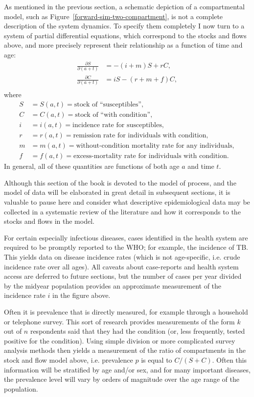 As mentioned in the previous section, a schematic depiction of a compartmental model, such as Figure~\ref{forward-sim-two-compartment}, is not a complete description of the system dynamics.  To specify them completely I now turn to a system of partial differential equations, which correspond to the stocks and flows above, and more precisely represent their relationship as a function of time and age: 
\begin{align*}
\frac{\partial S}{\partial (a+t)} &= -(i + m)S + rC,\\
\frac{\partial C}{\partial (a+t)} &= iS - (r + m + f)C,\\
\end{align*}
where
\begin{align*}
S &= S(a,t) = \text{stock of ``susceptibles''},\\
C &= C(a,t) = \text{stock of ``with condition''},\\[.1in]
i &= i(a,t) = \text{incidence rate for susceptibles},\\
r &= r(a,t) = \text{remission rate for individuals with condition},\\
m &= m(a,t) = \text{without-condition mortality rate for any individuals},\\
f &= f(a,t) = \text{excess-mortality rate for individuals with
condition}.
\end{align*}
In general, all of these quantities are functions of both age $a$ and time $t$.

Although this section of the book is devoted to the model of process, and the model of data will be elaborated in great detail in subsequent sections, it is valuable to pause here and consider what descriptive epidemiological data may be collected in a systematic review of the literature and how it corresponds to the stocks and flows in the model.

For certain especially infectious diseases, cases identified in the health system are required to be promptly reported to the WHO; for example, the incidence of TB.  This yields data on disease incidence rates (which is not age-specific, i.e. crude incidence rate over all ages).  All caveats about case-reports and health system access are deferred to future sections, but the number of cases per year divided by the midyear population provides an approximate measurement of the incidence rate $i$ in the figure above.

Often it is prevalence that is directly measured, for example through a household or telephone survey.  This sort of research provides measurements of the form $k$ out of $n$ respondents said that they had the condition (or, less frequently, tested positive for the condition). Using simple division or more complicated survey analysis methods then yields a measurement of the ratio of compartments in the stock and flow model above, i.e. prevalence $p$ is equal to $C/(S+C)$.  Often this information will be stratified by age and/or sex, and for many important diseases, the prevalence level will vary by orders of magnitude over the age range of the population.

